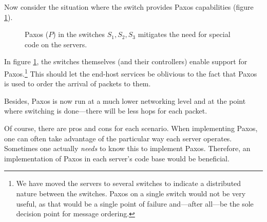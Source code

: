 Now consider the situation where the switch provides Paxos
capabilities (figure \ref{figure:paxos.on.switches}).

\begin{figure}[H]
  \centering
  \caption{Paxos ($P$) in the switches $S_1, S_2, S_3$ mitigates the need for special code on the servers.}
  \label{figure:paxos.on.switches}
\end{figure}

In figure \ref{figure:paxos.on.switches}, the switches themselves (and their
controllers) enable
support for Paxos.\footnote{We have moved the servers to several switches
to indicate a distributed nature between the switches.
Paxos on a single switch would not be very useful, as that would be a single
point of failure and---after all---be the sole decision point for message
ordering.}
%
This should let the end-host services be oblivious to the fact that Paxos is
used to order the arrival of packets to them.

Besides, Paxos is now run at a much lower networking level and at the point where switching is done---there will be less hops
for each packet.

Of course, there are pros and cons for each scenario.
When implementing Paxos, one can often take advantage of
the particular way each server operates. Sometimes one actually
\textit{needs} to know this to implement Paxos.  Therefore, an
implementation of Paxos in each server's code base would be beneficial.

